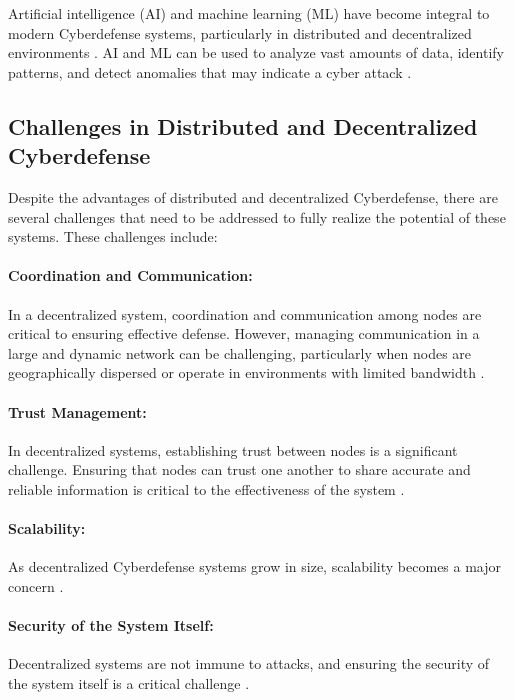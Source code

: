Artificial intelligence (AI) and machine learning (ML) have become integral to modern Cyberdefense systems, particularly in distributed and decentralized environments \cite{Buczak2016}. AI and ML can be used to analyze vast amounts of data, identify patterns, and detect anomalies that may indicate a cyber attack \cite{Vinayakumar2019}.

\subsection{Challenges in Distributed and Decentralized Cyberdefense}

Despite the advantages of distributed and decentralized Cyberdefense, there are several challenges that need to be addressed to fully realize the potential of these systems. These challenges include:

\paragraph{Coordination and Communication:}
In a decentralized system, coordination and communication among nodes are critical to ensuring effective defense. However, managing communication in a large and dynamic network can be challenging, particularly when nodes are geographically dispersed or operate in environments with limited bandwidth \cite{Xu2017}.

\paragraph{Trust Management:}
In decentralized systems, establishing trust between nodes is a significant challenge. Ensuring that nodes can trust one another to share accurate and reliable information is critical to the effectiveness of the system \cite{Yan2014}.

\paragraph{Scalability:}
As decentralized Cyberdefense systems grow in size, scalability becomes a major concern \cite{Bera2017}.

\paragraph{Security of the System Itself:}
Decentralized systems are not immune to attacks, and ensuring the security of the system itself is a critical challenge \cite{Roman2013}.

